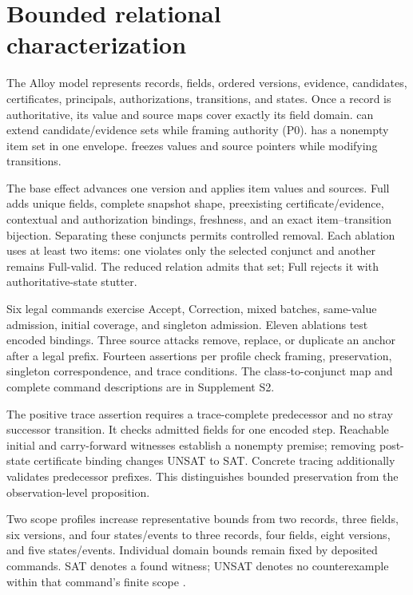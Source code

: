 \section{Bounded relational characterization}
\label{sec:alloy}

The Alloy model represents records, fields, ordered versions, evidence, candidates, certificates, principals, authorizations, transitions, and states. Once a record is authoritative, its value and source maps cover exactly its field domain.  can extend candidate/evidence sets while framing authority (P0).  has a nonempty item set in one envelope.  freezes values and source pointers while modifying transitions.

The base effect advances one version and applies item values and sources. Full adds unique fields, complete snapshot shape, preexisting certificate/evidence, contextual and authorization bindings, freshness, and an exact item--transition bijection. Separating these conjuncts permits controlled removal. Each ablation uses at least two items: one violates only the selected conjunct and another remains Full-valid. The reduced relation admits that set; Full rejects it with authoritative-state stutter.

Six legal commands exercise Accept, Correction, mixed batches, same-value admission, initial coverage, and singleton admission. Eleven ablations test encoded bindings. Three source attacks remove, replace, or duplicate an anchor after a legal prefix. Fourteen assertions per profile check framing, preservation, singleton correspondence, and trace conditions. The class-to-conjunct map and complete command descriptions are in Supplement S2.

The positive trace assertion requires a trace-complete predecessor and no stray successor transition. It checks admitted fields for one encoded step. Reachable initial and carry-forward witnesses establish a nonempty premise; removing post-state certificate binding changes UNSAT to SAT. Concrete tracing additionally validates predecessor prefixes. This distinguishes bounded preservation from the observation-level proposition.

Two scope profiles increase representative bounds from two records, three fields, six versions, and four states/events to three records, four fields, eight versions, and five states/events. Individual domain bounds remain fixed by deposited commands. SAT denotes a found witness; UNSAT denotes no counterexample within that command's finite scope \citep{jackson2002alloy,torlak2007kodkod}.


